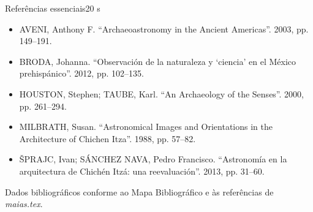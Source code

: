 \documentclass[aspectratio=169,11pt]{beamer}
\newcommand{\source}[1]{\vfill{\tiny\color{mayaInk!70}#1}}
\newcommand{\minutes}[1]{\hfill{\scriptsize\color{mayaJade}#1}}
\begin{document}
\begin{frame}{Referências essenciais}\minutes{20 s}
  \small
  \begin{itemize}
    \item AVENI, Anthony F. “Archaeoastronomy in the Ancient Americas”. 2003, pp. 149–191.
    \item BRODA, Johanna. “Observación de la naturaleza y ‘ciencia’ en el México prehispánico”. 2012, pp. 102–135.
    \item HOUSTON, Stephen; TAUBE, Karl. “An Archaeology of the Senses”. 2000, pp. 261–294.
    \item MILBRATH, Susan. “Astronomical Images and Orientations in the Architecture of Chichen Itza”. 1988, pp. 57–82.
    \item ŠPRAJC, Ivan; SÁNCHEZ NAVA, Pedro Francisco. “Astronomía en la arquitectura de Chichén Itzá: una reevaluación”. 2013, pp. 31–60.
  \end{itemize}
  \source{Dados bibliográficos conforme ao Mapa Bibliográfico e às referências de \textit{maias.tex}.}
\end{frame}
\end{document}
